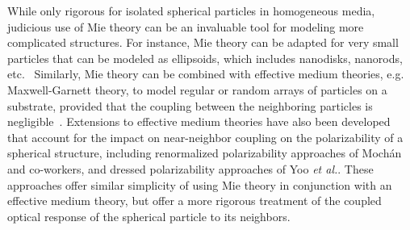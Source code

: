 \documentclass[review]{elsarticle}
\begin{document}
While only rigorous for 
isolated spherical particles in homogeneous media, judicious use of Mie theory can be an invaluable tool for modeling more complicated structures.  For instance, Mie theory can 
be adapted for very small particles that can be modeled as ellipsoids, which includes nanodisks, 
nanorods, etc.~\cite{Bohren}  Similarly, Mie theory 
can be combined with effective medium theories, e.g. Maxwell-Garnett theory, to model 
regular or random arrays of particles on a substrate, provided that the coupling 
between the neighboring particles is negligible~\cite{Bohren}.  
Extensions to effective medium theories have also
been developed that account for the impact on near-neighbor coupling on the 
polarizability of a spherical structure, 
including renormalized polarizability approaches of Moch\'{a}n and co-workers\cite{BCM_PRB_1988,BMM_PRB_1991}, and dressed
polarizability approaches of Yoo {\it et al.}\cite{YP_OptExpress_2012}.  These approaches offer similar simplicity of
using Mie theory in conjunction with an effective medium theory, but offer a more rigorous treatment of the coupled
optical response of the spherical particle to its neighbors. 
\end{document}
